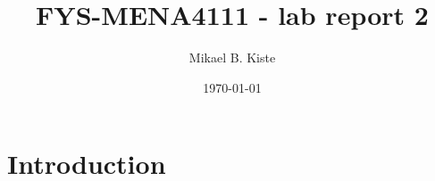 \documentclass[a4paper,10pt]{article}
\date{\today}
\title{FYS-MENA4111 - lab report 2}
\author{Mikael B. Kiste}
\begin{document}
  \maketitle
  \tableofcontents

  \newpage
  \section{Introduction}
  
\end{document}
